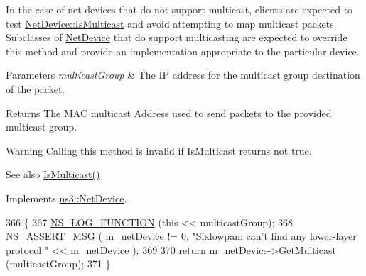 In the case of net devices that do not support multicast, clients are expected to test \hyperlink{classns3_1_1NetDevice_a1afb4848a9226540f1ff51f9b31ae95e}{Net\+Device\+::\+Is\+Multicast} and avoid attempting to map multicast packets. Subclasses of \hyperlink{classns3_1_1NetDevice}{Net\+Device} that do support multicasting are expected to override this method and provide an implementation appropriate to the particular device.


\begin{DoxyParams}{Parameters}
{\em multicast\+Group} & The IP address for the multicast group destination of the packet. \\
\hline
\end{DoxyParams}
\begin{DoxyReturn}{Returns}
The M\+AC multicast \hyperlink{classns3_1_1Address}{Address} used to send packets to the provided multicast group.
\end{DoxyReturn}
\begin{DoxyWarning}{Warning}
Calling this method is invalid if Is\+Multicast returns not true. 
\end{DoxyWarning}
\begin{DoxySeeAlso}{See also}
\hyperlink{classns3_1_1SixLowPanNetDevice_aadf6da2a7dd31391cd7feb3cb34d0b5e}{Is\+Multicast()} 
\end{DoxySeeAlso}


Implements \hyperlink{classns3_1_1NetDevice_a98aa4852df367b6a393c8cc1d88af0d9}{ns3\+::\+Net\+Device}.


\begin{DoxyCode}
366 \{
367   \hyperlink{log-macros-disabled_8h_a90b90d5bad1f39cb1b64923ea94c0761}{NS\_LOG\_FUNCTION} (\textcolor{keyword}{this} << multicastGroup);
368   \hyperlink{assert_8h_aff5ece9066c74e681e74999856f08539}{NS\_ASSERT\_MSG} ( \hyperlink{classns3_1_1SixLowPanNetDevice_a758b615a8b8f811ae3517ab9c7574f7b}{m\_netDevice} != 0, \textcolor{stringliteral}{"Sixlowpan: can't find any lower-layer protocol
       "} << \hyperlink{classns3_1_1SixLowPanNetDevice_a758b615a8b8f811ae3517ab9c7574f7b}{m\_netDevice} );
369 
370   \textcolor{keywordflow}{return} \hyperlink{classns3_1_1SixLowPanNetDevice_a758b615a8b8f811ae3517ab9c7574f7b}{m\_netDevice}->GetMulticast (multicastGroup);
371 \}
\end{DoxyCode}
